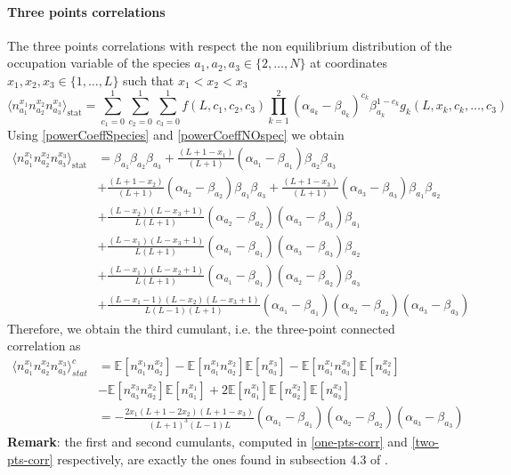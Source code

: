 \documentclass[10pt]{article}
\numberwithin{equation}{section}
\numberwithin{equation}{subsection}
\begin{document}
\paragraph{Three points correlations}
The three points correlations with respect the non equilibrium distribution of the occupation variable of the species $a_{1},a_{2},a_{3}\in \{2,\ldots,N\}$ at coordinates $x_{1},x_{2},x_{3}\in \{1,\ldots,L\}$ such that $x_{1}<x_{2}<x_{3}$
\begin{equation}
    \langle n_{a_{1}}^{x_{1}}n_{a_{2}}^{x_{2}}n_{a_{3}}^{x_{3}}\rangle_{\text{stat}}=\sum_{c_{1}=0}^{1}\sum_{c_{2}=0}^{1}\sum_{c_{3}=0}^{1}f(L,c_{1},c_{2},c_{3})\prod_{k=1}^{2}(\alpha_{a_{k}}-\beta_{a_{k}})^{c_{k}}\beta_{a_{k}}^{1-c_{k}}g_{k}(L,x_{k},c_{k},\ldots,c_{3})
\end{equation}
Using \eqref{powerCoeffSpecies} and \eqref{powerCoeffNOspec} we obtain 
\begin{align}\label{three-pts-corr}
        \langle n_{a_{1}}^{x_{1}}n_{a_{2}}^{x_{2}}n_{a_{3}}^{x_{3}}\rangle_{\text{stat}}&=\beta_{a_{1}}\beta_{a_{2}}\beta_{a_{3}}+\frac{(L+1-x_{1})}{(L+1)}(\alpha_{a_{1}}-\beta_{a_{1}})\beta_{a_{2}}\beta_{a_{3}}
        \\&+\nonumber
        \frac{(L+1-x_{2})}{(L+1)}(\alpha_{a_{2}}-\beta_{a_{2}})\beta_{a_{1}}\beta_{a_{3}}+\frac{(L+1-x_{3})}{(L+1)}(\alpha_{a_{3}}-\beta_{a_{3}})\beta_{a_{1}}\beta_{a_{2}}
        \\&+\nonumber
        \frac{(L-x_{2})(L-x_{3}+1)}{L(L+1)}(\alpha_{a_{2}}-\beta_{a_{2}})(\alpha_{a_{3}}-\beta_{a_{3}})\beta_{a_{1}}
        \\&+\nonumber
        \frac{(L-x_{1})(L-x_{3}+1)}{L(L+1)}(\alpha_{a_{1}}-\beta_{a_{1}})(\alpha_{a_{3}}-\beta_{a_{3}})\beta_{a_{2}}
        \\&+\nonumber
        \frac{(L-x_{1})(L-x_{2}+1)}{L(L+1)}(\alpha_{a_{1}}-\beta_{a_{1}})(\alpha_{a_{2}}-\beta_{a_{2}})\beta_{a_{3}}
        \\&+\nonumber
        \frac{(L-x_{1}-1)(L-x_{2})(L-x_{3}+1)}{L(L-1)(L+1)}(\alpha_{a_{1}}-\beta_{a_{1}})(\alpha_{a_{2}}-\beta_{a_{2}})(\alpha_{a_{3}}-\beta_{a_{3}})
\end{align}
Therefore, we obtain the third cumulant, i.e. the three-point connected correlation as 
\begin{align}
	\langle n_{a_{1}}^{x_{1}}n_{a_{2}}^{x_{2}}n_{a_{3}}^{x_{3}}\rangle_{stat}^{c}&=\mathbb{E}\left[n_{a_{1}}^{x_{1}}n_{a_{2}}^{x_{2}}\right]-\mathbb{E}\left[n_{a_{1}}^{x_{1}}n_{a_{2}}^{x_{2}}\right]\mathbb{E}\left[n_{a_{3}}^{x_{3}}\right]-\mathbb{E}\left[n_{a_{1}}^{x_{1}}n_{a_{3}}^{x_{3}}\right]\mathbb{E}\left[n_{a_{2}}^{x_{2}}\right]\\&-\mathbb{E}\left[n_{a_{3}}^{x_{3}}n_{a_{2}}^{x_{2}}\right]\mathbb{E}\left[n_{a_{1}}^{x_{1}}\right]+2\mathbb{E}\left[n_{a_{1}}^{x_{1}}\right]\mathbb{E}\left[n_{a_{2}}^{x_{2}}\right]\mathbb{E}\left[n_{a_{3}}^{x_{3}}\right]
	\\&=
	-\frac{2x_{1}(L+1-2x_{2})(L+1-x_{3})}{(L+1)^{3}(L-1)L}(\alpha_{a_{1}}-\beta_{a_{1}})(\alpha_{a_{2}}-\beta_{a_{2}})(\alpha_{a_{3}}-\beta_{a_{3}})
\end{align}
\textbf{Remark}: the first and second cumulants, computed in \eqref{one-pts-corr} and \eqref{two-pts-corr} respectively, are exactly the ones found in subsection 4.3 of \cite{vanicat2017exact}. 
\end{document}

